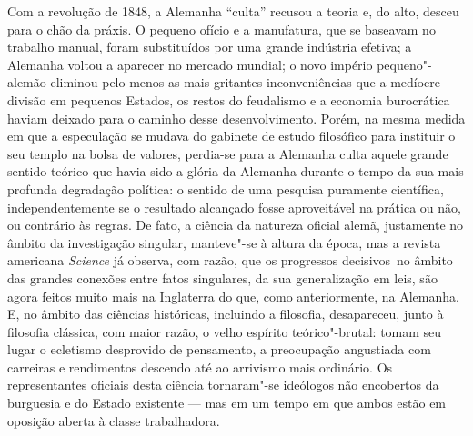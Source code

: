 Com a revolução de 1848, a Alemanha ``culta'' recusou a teoria e, do
alto, desceu para o chão da práxis. O pequeno ofício e a manufatura, que
se baseavam no trabalho manual, foram substituídos por uma grande
indústria efetiva; a Alemanha voltou a aparecer no mercado mundial; o
novo império pequeno"-alemão eliminou pelo
menos as mais gritantes inconveniências que a medíocre divisão em pequenos
Estados, os restos 
do feudalismo e a economia burocrática haviam deixado para o caminho
desse desenvolvimento. Porém, na mesma medida em que a especulação se mudava do gabinete de estudo filosófico para instituir o seu templo na bolsa de valores, perdia-se para a Alemanha culta aquele grande sentido teórico que havia sido a glória da Alemanha durante o tempo da sua mais profunda degradação política: o sentido de uma pesquisa puramente científica, independentemente se o resultado alcançado fosse aproveitável na prática ou não, ou contrário
às regras. De fato, a ciência da natureza oficial alemã, justamente no
âmbito da investigação singular, manteve"-se à altura da época, mas a
revista americana \emph{Science} já observa, com razão, que os
progressos decisivos\est\ no âmbito das grandes conexões entre fatos
singulares, da sua generalização em leis, são agora feitos muito mais na
Inglaterra do que, como anteriormente, na Alemanha. E, no âmbito das
ciências históricas, incluindo a filosofia, desapareceu, junto à
filosofia clássica, com maior razão, o velho 
espírito teórico"-brutal: tomam seu lugar o ecletismo desprovido de pensamento, a preocupação angustiada com carreiras e rendimentos descendo até ao arrivismo mais ordinário. Os representantes oficiais desta ciência tornaram"-se ideólogos
não encobertos da burguesia e do Estado existente --- mas em um tempo em
que ambos estão em oposição aberta à classe trabalhadora.

